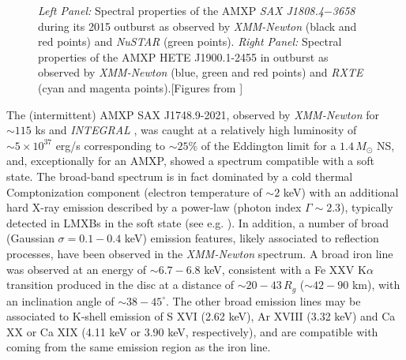 \documentclass[graybox]{svmult}
\def \inte {{\em INTEGRAL\xspace}}
\def \xmm {{\em XMM-Newton\xspace}}
\def \rxte {{\em RXTE\xspace}}
\def \saxj{{\em SAX J1808.4$-$3658\xspace}}
\def \nustar{{\em NuSTAR\xspace}}
\begin{document}
\begin{figure}
\begin{subfigure}{.5\textwidth}
  \label{fig:sfig2}
\end{subfigure}
\caption{\textit{Left Panel:} Spectral properties of the AMXP \saxj{} during its 2015 outburst as observed by \xmm{} (black and red points) and \nustar{} (green points). \textit{Right Panel:} Spectral properties of the AMXP HETE J1900.1-2455 in outburst as observed by \xmm{} (blue, green and red points) and \rxte{} (cyan and magenta points).[Figures from \cite{DiSalvo2019,Papitto2013a}]}
\label{fig:spec}
\end{figure}





The (intermittent) AMXP SAX J1748.9-2021, observed by \xmm{} for $\sim 115$ ks and \inte{} \cite{Pintore2016}, was caught at a relatively high luminosity of $\sim 5 \times 10^{37}$ erg/s corresponding to $\sim 25\%$ of the Eddington limit for a $1.4\, M_\odot$ NS, and, exceptionally for an AMXP, showed a spectrum compatible with a soft state. The broad-band spectrum is in fact dominated by a cold thermal Comptonization component (electron temperature of $\sim 2$ keV) with an additional hard X-ray emission described by a power-law (photon index $\Gamma \sim 2.3$), typically detected in LMXBs in the soft state (see e.g. \cite{DiSalvo2000}). In addition, a number of broad (Gaussian $\sigma = 0.1 - 0.4$ keV) emission features, likely associated to reflection processes, have been observed in the \xmm{} spectrum. A broad iron line was observed at an energy of $\sim 6.7-6.8$ keV, consistent with a Fe XXV K$\alpha$ transition produced in the disc at a distance of $\sim 20-43\, R_g$ ($\sim 42 - 90$ km), with an inclination angle of $\sim 38-45^\circ$. The other broad emission lines may be associated to K-shell emission of S XVI (2.62 keV), Ar XVIII (3.32 keV) and Ca XX or Ca XIX (4.11 keV or 3.90 keV, respectively), and are compatible with coming from the same emission region as the iron line. 
\end{document}
